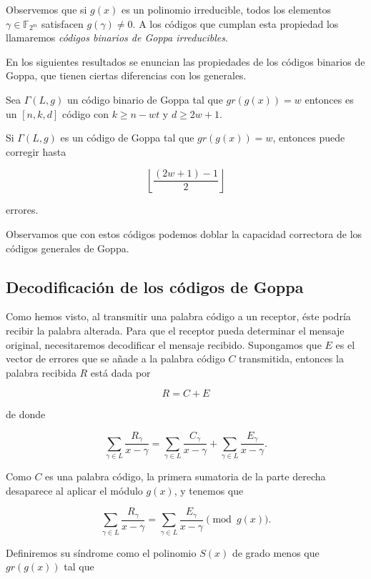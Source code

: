 Observemos que si $g(x)$ es un polinomio irreducible, todos los elementos $\gamma \in \mathbb{F}_{2^m}$ satisfacen $g(\gamma) \neq 0$. A los códigos que cumplan esta propiedad los llamaremos \emph{códigos binarios de Goppa irreducibles}.

En los siguientes resultados se enuncian las propiedades de los códigos binarios de Goppa, que tienen ciertas diferencias con los generales.

\begin{theorem}
    Sea $\Gamma(L,g)$ un código binario de Goppa tal que $gr(g(x)) = w$ entonces es un $[n, k, d]$ código con $k \geq n - wt$ y $d \geq 2w + 1$.
\end{theorem}

\begin{corollary}
    Si $\Gamma(L,g)$ es un código de Goppa tal que $gr(g(x)) = w$, entonces puede corregir hasta

    $$\left\lfloor \frac{(2w + 1) - 1}{2} \right\rfloor $$

    errores.
\end{corollary}

Observamos que con estos códigos podemos doblar la capacidad correctora de los códigos generales de Goppa.


\subsection{Decodificación de los códigos de Goppa}

Como hemos visto, al transmitir una palabra código a un receptor, éste podría recibir la palabra alterada. Para que el receptor pueda determinar el mensaje original, necesitaremos decodificar el mensaje recibido. Supongamos que $E$ es el vector de errores que se añade a la palabra código $C$ transmitida, entonces la palabra recibida $R$ está dada por

$$R = C + E$$

de donde 

$$\sum_{\gamma \in L} \frac{R_\gamma}{x - \gamma} = \sum_{\gamma \in L} \frac{C_\gamma}{x - \gamma} + \sum_{\gamma \in L} \frac{E_\gamma}{x - \gamma}.$$

Como $C$ es una palabra código, la primera sumatoria de la parte derecha desaparece al aplicar el módulo $g(x)$, y tenemos que

$$\sum_{\gamma \in L} \frac{R_\gamma}{x - \gamma} = \sum_{\gamma \in L} \frac{E_\gamma}{x - \gamma} \pmod{g(x)}.$$

Definiremos su síndrome como el polinomio $S(x)$ de grado menos que $gr(g(x))$ tal que 

